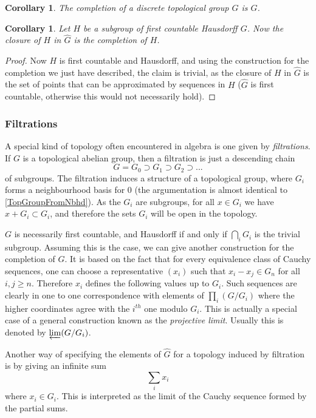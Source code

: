 \documentclass[12pt,a4paper,leqno]{article}
\newcommand{\fref}[1]{\hyperref[{#1}]{\ref*{#1}}}
\theoremstyle{plain}
\newtheorem{cor}[theo]{Corollary}
\theoremstyle{definition}
\theoremstyle{remark}
\begin{document}
\begin{cor}
The completion of a discrete topological group $G$ is $G$.
\end{cor} 

\begin{cor}
Let $H$ be a subgroup of first countable Hausdorff $G$. Now the closure of $H$ in $\hat G$ is the completion of $H$.
\end{cor}
\begin{proof}
Now $H$ is first countable and Hausdorff, and using the construction for the completion we just have described, the claim is trivial, as the closure of $H$ in $\hat G$ is the set of points that can be approximated by sequences in $H$ ($\hat G$ is first countable, otherwise this would not necessarily hold).
\end{proof}

\subsubsection*{Filtrations}

A special kind of topology often encountered in algebra is one given by \emph{filtrations}. If $G$ is a topological abelian group, then a filtration is just a descending chain 
\begin{equation*}
G = G_0 \supset G_1 \supset G_2 \supset ...
\end{equation*}
of subgroups. The filtration induces a structure of a topological group, where $G_i$ forms a neighbourhood basis for $0$ (the argumentation is almost identical to \fref{TopGroupFromNbhd}). As the $G_i$ are subgroups, for all $x \in G_i$ we have $x + G_i \subset G_i$, and therefore the sets $G_i$ will be open in the topology.

$G$ is necessarily first countable, and Hausdorff if and only if $\bigcap_i G_i$ is the trivial subgroup. Assuming this is the case, we can give another construction for the completion of $G$. It is based on the fact that for every equivalence class of Cauchy sequences, one can choose a representative $(x_i)$ such that $x_i - x_j \in G_n$ for all $i,j \geq n$. Therefore $x_i$ defines the following values up to $G_i$. Such sequences are clearly in one to one correspondence with elements of $\prod_i (G/G_i)$ where the higher coordinates agree with the $i^{th}$ one modulo $G_i$. This is actually a special case of a general construction known as the \emph{projective limit}. Usually this is denoted by $\varprojlim (G/G_i)$.

Another way of specifying the elements of $\hat G$ for a topology induced by filtration is by giving an infinite sum
\begin{equation*}
\sum_i x_i
\end{equation*}
where $x_i \in G_i$. This is interpreted as the limit of the Cauchy sequence formed by the partial sums.
\end{document}
